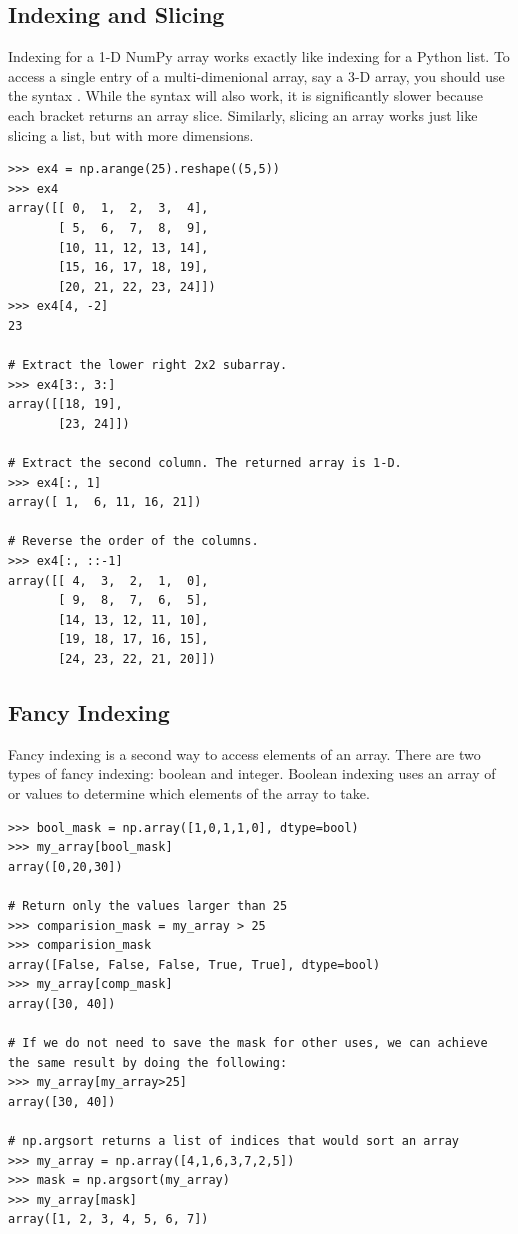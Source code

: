 \subsection*{Indexing and Slicing} 
Indexing for a 1-D NumPy array works exactly like indexing for a Python list. 
To access a single entry of a multi-dimenional array, say a 3-D array, you should use the syntax . 
While the syntax  will also work, it is significantly slower because each bracket returns an array slice. 
Similarly, slicing an array works just like slicing a list, but with more dimensions.
\begin{lstlisting}
>>> ex4 = np.arange(25).reshape((5,5)) 
>>> ex4
array([[ 0,  1,  2,  3,  4],
       [ 5,  6,  7,  8,  9],
       [10, 11, 12, 13, 14],
       [15, 16, 17, 18, 19],
       [20, 21, 22, 23, 24]])
>>> ex4[4, -2]
23

# Extract the lower right 2x2 subarray.
>>> ex4[3:, 3:] 
array([[18, 19],
       [23, 24]])
       
# Extract the second column. The returned array is 1-D.
>>> ex4[:, 1] 
array([ 1,  6, 11, 16, 21]) 

# Reverse the order of the columns.
>>> ex4[:, ::-1] 
array([[ 4,  3,  2,  1,  0],
       [ 9,  8,  7,  6,  5],
       [14, 13, 12, 11, 10],
       [19, 18, 17, 16, 15],
       [24, 23, 22, 21, 20]])
\end{lstlisting}

\subsection*{Fancy Indexing}
Fancy indexing is a second way to access elements of an array. 
There are two types of fancy indexing: boolean and integer. 
Boolean indexing uses an array of  or  values to 
determine which elements of the array to take. 

\begin{lstlisting}
>>> bool_mask = np.array([1,0,1,1,0], dtype=bool)
>>> my_array[bool_mask]
array([0,20,30])

# Return only the values larger than 25
>>> comparision_mask = my_array > 25
>>> comparision_mask
array([False, False, False, True, True], dtype=bool)
>>> my_array[comp_mask]
array([30, 40])

# If we do not need to save the mask for other uses, we can achieve the same result by doing the following:
>>> my_array[my_array>25]
array([30, 40])

# np.argsort returns a list of indices that would sort an array
>>> my_array = np.array([4,1,6,3,7,2,5])
>>> mask = np.argsort(my_array)
>>> my_array[mask]
array([1, 2, 3, 4, 5, 6, 7])
\end{lstlisting}

